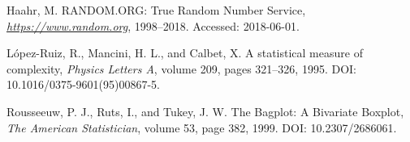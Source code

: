 \documentclass[a4,11pt]{pssbmac}
\begin{document}
\begin{thebibliography}{00}
	 Haahr, M.
	RANDOM.ORG: True Random Number Service,
	{\it \url{https://www.random.org}}, 
	1998--2018. 
	Accessed: 2018-06-01.
	
	 L\'opez-Ruiz, R., Mancini, H. L., and Calbet, X.
	A statistical measure of complexity, 
	{\it Physics Letters A}, 
	volume 209, 
	pages 321--326,
	1995. 
	DOI: 10.1016/0375-9601(95)00867-5.
	
	 Rousseeuw, P. J., Ruts, I., and Tukey, J. W.
	The Bagplot: A Bivariate Boxplot,
	{\it The American Statistician}, 
	volume 53, 
	page 382,
	1999. 
	DOI: 10.2307/2686061.
	
\end{thebibliography}
\end{document}
